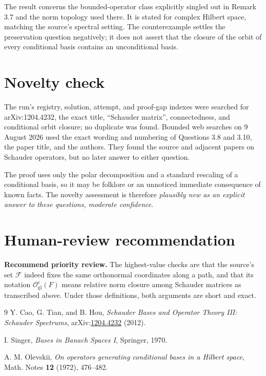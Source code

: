 \documentclass[11pt]{article}
\newcommand{\Ff}{\mathcal F}
\newcommand{\Ogl}{\mathcal O_{\mathrm{gl}}}
\begin{document}
The result concerns the bounded-operator class explicitly singled out in
Remark 3.7 and the norm topology used there.  It is stated for complex
Hilbert space, matching the source's spectral setting.  The counterexample
settles the preservation question negatively; it does not assert that the
closure of the orbit of every conditional basis contains an unconditional
basis.

\section{Novelty check}

The run's registry, solution, attempt, and proof-gap indexes were searched
for arXiv:1204.4232, the exact title, ``Schauder matrix'', connectedness, and
conditional orbit closure; no duplicate was found.  Bounded web searches on
9 August 2026 used the exact wording and numbering of Questions 3.8 and 3.10,
the paper title, and the authors.  They found the source and adjacent papers
on Schauder operators, but no later answer to either question.

The proof uses only the polar decomposition and a standard rescaling of a
conditional basis, so it may be folklore or an unnoticed immediate
consequence of known facts.  The novelty assessment is therefore
\emph{plausibly new as an explicit answer to these questions, moderate
confidence}.

\section{Human-review recommendation}

\textbf{Recommend priority review.}  The highest-value checks are that the
source's set $\Ff$ indeed fixes the same orthonormal coordinates along a path,
and that its notation $\Ogl^c(F)$ means relative norm closure among Schauder
matrices as transcribed above.  Under those definitions, both arguments are
short and exact.

\begin{thebibliography}{9}
Y. Cao, G. Tian, and B. Hou,
\emph{Schauder Bases and Operator Theory III: Schauder Spectrums},
arXiv:\href{https://arxiv.org/abs/1204.4232}{1204.4232} (2012).

I. Singer,
\emph{Bases in Banach Spaces I}, Springer, 1970.

A. M. Olevskii,
\emph{On operators generating conditional bases in a Hilbert space},
Math. Notes \textbf{12} (1972), 476--482.
\end{thebibliography}
\end{document}
